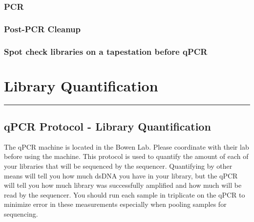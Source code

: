 \documentclass[
  letterpaper,
  DIV=11,
  numbers=noendperiod]{scrreprt}
\begin{document}
\hypertarget{pcr}{%
\subsection*{\texorpdfstring{\textbf{PCR}}{PCR}}\label{pcr}}

\hypertarget{post-pcr-cleanup}{%
\subsection*{\texorpdfstring{\textbf{Post-PCR
Cleanup}}{Post-PCR Cleanup}}\label{post-pcr-cleanup}}

\hypertarget{spot-check-libraries-on-a-tapestation-before-qpcr}{%
\subsection*{\texorpdfstring{\textbf{Spot check libraries on a
tapestation before
qPCR}}{Spot check libraries on a tapestation before qPCR}}\label{spot-check-libraries-on-a-tapestation-before-qpcr}}

\hypertarget{library-quantification}{%
\chapter{Library Quantification}\label{library-quantification}}

\begin{center}\rule{0.5\linewidth}{0.5pt}\end{center}

\hypertarget{qpcr-protocol---library-quantification}{%
\section*{\texorpdfstring{\textbf{qPCR Protocol - Library
Quantification}}{qPCR Protocol - Library Quantification}}\label{qpcr-protocol---library-quantification}}

The qPCR machine is located in the Bowen Lab. Please coordinate with
their lab before using the machine. This protocol is used to quantify
the amount of each of your libraries that will be sequenced by the
sequencer. Quantifying by other means will tell you how much dsDNA you
have in your library, but the qPCR will tell you how much library was
successfully amplified and how much will be read by the sequencer. You
should run each sample in triplicate on the qPCR to minimize error in
these measurements especially when pooling samples for sequencing.
\end{document}
